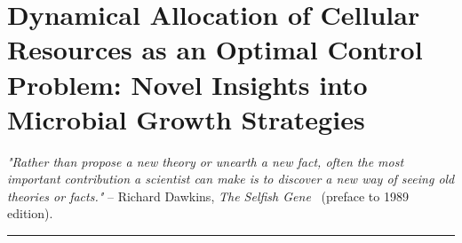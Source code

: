 \chapter[Dynamical Allocation of Cellular Resources as an Optimal Control Problem]{Dynamical Allocation of Cellular Resources as an Optimal Control Problem: Novel Insights into Microbial Growth Strategies}
\label{chap:theory}

\textit{"Rather than propose a new theory or unearth a new fact, often the most important contribution a scientist can make is to discover a new way of seeing old theories or facts."} -- Richard Dawkins, \textit{The Selfish Gene}~\cite{dawkins_selfish_1976} (preface to 1989 edition).

\begin{center}
\noindent\rule{4cm}{0.1pt}
\end{center}

